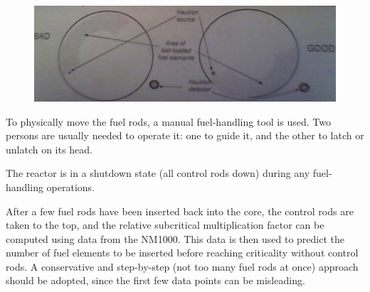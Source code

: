 \begin{figure}[t!]
	\centering
	\includegraphics[height=0.2\textheight]{fig01/goodbaddet.png}
	\label{fig:goodbaddet}
\end{figure}

To physically move the fuel rods, a manual fuel-handling tool is used. Two persons are usually needed to operate it: one to guide it, and the other to latch or unlatch on its head.

The reactor is in a shutdown state (all control rods down) during any fuel-handling operations.

After a few fuel rods have been inserted back into the core, the control rods are taken to the top, and the relative subcritical multiplication factor can be computed using data from the NM1000. This data is then used to predict the number of fuel elements to be inserted before reaching criticality without control rods. A conservative and step-by-step (not too many fuel rods at once) approach should be adopted, since the first few data points can be misleading.



